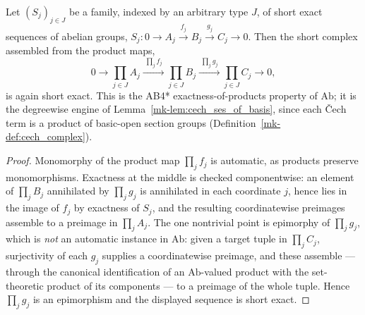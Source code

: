 \begin{lemma}
  \label{mk-lem:short_exact_pi_map}

  Let \((S_j)_{j \in J}\) be a family, indexed by an arbitrary type \(J\), of short exact sequences
  of abelian groups, \(S_j : 0 \to A_j \xrightarrow{f_j} B_j \xrightarrow{g_j} C_j \to 0\). Then
  the short complex assembled from the product maps,
  \[
    0 \to \prod_{j \in J} A_j \xrightarrow{\;\prod_j f_j\;} \prod_{j \in J} B_j
      \xrightarrow{\;\prod_j g_j\;} \prod_{j \in J} C_j \to 0,
  \]
  is again short exact. This is the AB4* exactness-of-products property of \(\mathrm{Ab}\); it is
  the degreewise engine of Lemma~\ref{mk-lem:cech_ses_of_basis}, since each {\v C}ech term is a product
  of basic-open section groups (Definition~\ref{mk-def:cech_complex}).
\end{lemma}
\begin{proof}
  Monomorphy of the product map \(\prod_j f_j\) is automatic, as products preserve monomorphisms.
  Exactness at the middle is checked componentwise: an element of \(\prod_j B_j\) annihilated by
  \(\prod_j g_j\) is annihilated in each coordinate \(j\), hence lies in the image of \(f_j\) by
  exactness of \(S_j\), and the resulting coordinatewise preimages assemble to a preimage in
  \(\prod_j A_j\). The one nontrivial point is epimorphy of \(\prod_j g_j\), which is \emph{not} an
  automatic instance in \(\mathrm{Ab}\): given a target tuple in \(\prod_j C_j\), surjectivity of
  each \(g_j\) supplies a coordinatewise preimage, and these assemble — through the canonical
  identification of an \(\mathrm{Ab}\)-valued product with the set-theoretic product of its
  components — to a preimage of the whole tuple. Hence \(\prod_j g_j\) is an epimorphism and the
  displayed sequence is short exact.
\end{proof}

